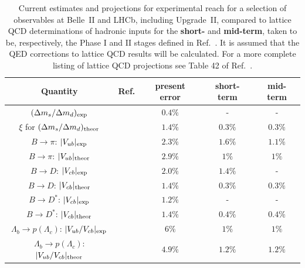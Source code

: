 \begin{table}
\caption{Current estimates and projections for experimental reach for a selection of observables at Belle~II and LHCb, including Upgrade~II, compared to lattice QCD determinations of hadronic inputs for the {\bf short-} and {\bf mid-term}, taken to be, respectively, the Phase I and II stages defined in Ref.~\cite{Cerri:2018ypt}. It is assumed that the QED corrections to lattice QCD results will be calculated. For a more complete listing of lattice QCD projections see Table 42 of Ref.~\cite{Cerri:2018ypt}.}
    \label{table:Proj}
    {\footnotesize
\begin{center}
\begin{tabular}{ccccc}
\hline\hline
Quantity & Ref. &present error & short-term & mid-term\\
\hline
$(\Delta m_s/\Delta m_d)_{\rm exp}$ & \cite{Tanabashi:2018oca} & $0.4\%$ & - & -
\\
$\xi$ for $(\Delta m_s/\Delta m_d)_{\rm theor}$ & \cite{Cerri:2018ypt} & $1.4\%$ & $0.3\%$ & $0.3\%$
\\
\hline
$B\to \pi$: $|V_{ub}|_{{\rm exp}}$ & \cite{Cerri:2018ypt,Bediaga:2018lhg,Kou:2018nap} &    $2.3\%$ & $1.6\%$ & $1.1\%$\\
$B\to \pi$: $|V_{ub}|_{{\rm theor}}$ & \cite{Cerri:2018ypt} &    $2.9\%$ & $1\%$ & $1\%$\\
\hline
$B\to D$: $|V_{cb}|_{{\rm exp}}$& \cite{Cerri:2018ypt,Kou:2018nap} &   $ 2.0\%$ & $1.4\%$ & -\\
$B\to D$: $|V_{cb}|_{{\rm theor}}$&\cite{Cerri:2018ypt} &    $1.4\%$ & $0.3\%$ & $0.3\%$\\
\hline
$B\to D^*$: $|V_{cb}|_{{\rm exp}}$ & \cite{Kou:2018nap}& $1.2\%$ &- & - \\ 
$B\to D^*$: $|V_{cb}|_{{\rm theor}}$ & \cite{Cerri:2018ypt}& $1.4\%$ & $0.4\%$ & $0.4\%$ \\  
\hline
$\Lambda_b\to p(\Lambda_c)$: $|V_{ub}/V_{cb}|_{{\rm exp}}$ & \cite{Bediaga:2018lhg} &   $ 6\%$ & $1\%$ & $1\%$\\
$\Lambda_b\to p(\Lambda_c)$: $|V_{ub}/V_{cb}|_{{\rm theor}}$  &\cite{Cerri:2018ypt} & $4.9\%$ & $1.2\%$ & $1.2\%$\\
\hline
\hline
\end{tabular}
\end{center}
}
\end{table}

